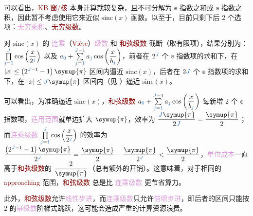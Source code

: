 可以看出，\textcolor{Maroon}{KB 窗/核} 本身计算就较复杂，且不可分解为 $\mathbb{e}$ 指数之和或 $\mathbb{e}$ 指数之积，因此暂不考虑使用它来近似 $\text{sinc} \left( x \right)$ 函数。以至于，目前只剩下后 2 个选项：\textcolor{Plum}{无穷乘积}、\textcolor{Maroon}{无穷级数}。

对 $\text{sinc} \left( x \right)$ 的 \textcolor{Plum}{连乘}（\textcolor{Maroon}{Viète}）\textcolor{Plum}{级数} 和 \textcolor{Maroon}{和弦级数} 截断（取有限项），结果分别为：$\prod\limits_{\textcolor{NavyBlue}{j}=\textcolor{NavyBlue}{1}}^{\textcolor{NavyBlue}{J}} \cos \left( \dfrac{x}{2^{\textcolor{NavyBlue}{j}}} \right)$ 以及 $a_{\textcolor{NavyBlue}{0}} + \sum\limits^{\textcolor{NavyBlue}{J}-1}_{\textcolor{NavyBlue}{j}=\textcolor{NavyBlue}{1}} {{a_{\textcolor{NavyBlue}{j}}}\cos \left( \displaystyle{ {\dfrac{x}{{{b_{\textcolor{NavyBlue}{j}}}}}} } \right)}$，前者在 $2^{\textcolor{NavyBlue}{J}}$ 个 $\mathbb{e}$ 指数项的求和下，在 $\left| x \right| \leq \left( 2^{\textcolor{NavyBlue}{J}-1}-1 \right) \symup{\pi}$ 区间内逼近 $\text{sinc} \left( x \right)$，后者在 $2 {\textcolor{NavyBlue}{J}}$ 个 $\mathbb{e}$ 指数项的求和下，在 $\left| x \right| \leq {\textcolor{NavyBlue}{J}} \symup{\pi}$ 区间内（见 ）逼近 $\text{sinc} \left( x \right)$。

可以看出，为准确逼近 $\text{sinc} \left( x \right)$，\textcolor{Maroon}{和弦级数} $a_{\textcolor{NavyBlue}{0}} + \sum\limits^{\textcolor{NavyBlue}{J}-1}_{\textcolor{NavyBlue}{j}=\textcolor{NavyBlue}{1}} {{a_{\textcolor{NavyBlue}{j}}}\cos \left( \displaystyle{ {\dfrac{x}{{{b_{\textcolor{NavyBlue}{j}}}}}} } \right)}$ 每新增 2 个 $\mathbb{e}$ 指数项，\textcolor{Plum}{适用范围}就单边扩大 $\symup{\pi}$，效率为 $\dfrac{{\textcolor{NavyBlue}{J}}\symup{\pi}}{2{\textcolor{NavyBlue}{J}}} = \dfrac{\symup{\pi}}{2}$；而\textcolor{Plum}{连乘级数} $\prod\limits_{\textcolor{NavyBlue}{j}=\textcolor{NavyBlue}{1}}^{\textcolor{NavyBlue}{J}} \cos \left( \dfrac{x}{2^{\textcolor{NavyBlue}{j}}} \right)$ 的效率为 $\dfrac{\left( 2^{\textcolor{NavyBlue}{J}-1}-1 \right) \symup{\pi}}{2^{\textcolor{NavyBlue}{J}}} = \dfrac{\symup{\pi}}{2}-\dfrac{\symup{\pi}}{2^{\textcolor{NavyBlue}{J}}} < \dfrac{\symup{\pi}}{2}$，\textcolor{Plum}{单位成本}一直高于\textcolor{Maroon}{和弦级数}的 $\dfrac{2}{\symup{\pi}}$（总有额外的开销）。这意味着，对于相同的 \textcolor{Maroon}{approaching} 范围，\textcolor{Maroon}{和弦级数} 总是比 \textcolor{Plum}{连乘级数} 更节省算力。

此外，\textcolor{Maroon}{和弦级数}允许\textcolor{Plum}{线性步进}，而\textcolor{Plum}{连乘级数}只允许\textcolor{Plum}{倍增步进}，即后者的区间只能按 $2$ 的\textcolor{Plum}{幂级数}阶梯式跳跃，这可能会造成严重的计算资源浪费。

